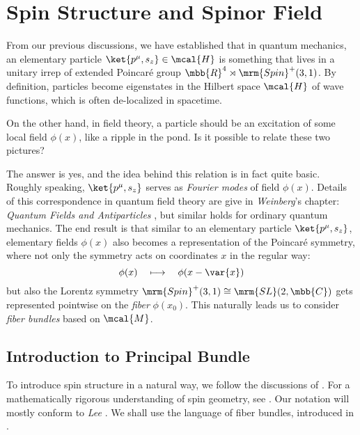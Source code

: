 \documentclass[a4paper,11pt]{article}
\begin{document}
\section{Spin Structure and Spinor Field}
	From our previous discussions, we have established that in quantum mechanics, an elementary particle $\ket{p^\mu,s_z}\in\mcal{H}$ is something that lives in a unitary irrep of extended Poincar\'e group $\mbb{R}^4\rtimes\mrm{Spin}^+(3,1)$. By definition, particles become eigenstates in the Hilbert space $\mcal{H}$ of wave functions, which is often de-localized in spacetime. 
	
	On the other hand, in field theory, a particle should be an excitation of some local field $\phi(x)$, like a ripple in the pond. Is it possible to relate these two pictures? 
	
	The answer is yes, and the idea behind this relation is in fact quite basic. Roughly speaking, $\ket{p^\mu,s_z}$ serves as \textit{Fourier modes} of field $\phi(x)$. Details of this correspondence in quantum field theory are give in \textit{Weinberg}'s chapter: \textit{Quantum Fields and Antiparticles} \cite{Weinberg:1995mt}, but similar holds for ordinary quantum mechanics. The end result is that similar to an elementary particle $\ket{p^\mu,s_z}$, elementary fields $\phi(x)$ also becomes a representation of the Poincar\'e symmetry, where not only the symmetry acts on coordinates $x$ in the regular way:
	\begin{equation}
		\phi(x)
		\quad\longmapsto\quad
		\phi(x-\var{x})
	\end{equation}
	but also the Lorentz symmetry $\mrm{Spin}^+(3,1) \cong \mrm{SL}(2,\mbb{C})$ gets represented pointwise on the \textit{fiber} $\phi(x_0)$. This naturally leads us to consider \textit{fiber bundles} based on $\mcal{M}$. 
\subsection{Introduction to Principal Bundle}
	To introduce spin structure in a natural way, we follow the discussions of \cite{figueroa2010spin,Nakahara:2003nw,AlvarezGaume:1986es,Wernli:2019hpf}. For a mathematically rigorous understanding of spin geometry, see \cite{lawson2016spin,bourguignon2015spinorial,jost2011riemannian}. Our notation will mostly conform to \textit{Lee} \cite{lee2012introduction}. We shall use the language of fiber bundles, introduced in \cite{Nakahara:2003nw,lee2012introduction}. 
\pagebreak[4]
	
\end{document}
